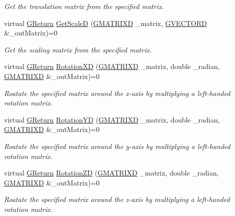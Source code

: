 \begin{DoxyCompactItemize}
\begin{DoxyCompactList}\small\item\em Get the translation matrix from the specified matrix. \end{DoxyCompactList}\item 
virtual \hyperlink{namespaceGW_a67a839e3df7ea8a5c5686613a7a3de21}{G\+Return} \hyperlink{classGW_1_1MATH_1_1GMatrix_a1d8d370c39617b8ad0fcfb42459fcb09}{Get\+ScaleD} (\hyperlink{structGW_1_1MATH_1_1GMATRIXD}{G\+M\+A\+T\+R\+I\+XD} \+\_\+matrix, \hyperlink{structGW_1_1MATH_1_1GVECTORD}{G\+V\+E\+C\+T\+O\+RD} \&\+\_\+out\+Matrix)=0
\begin{DoxyCompactList}\small\item\em Get the scaling matrix from the specified matrix. \end{DoxyCompactList}\item 
virtual \hyperlink{namespaceGW_a67a839e3df7ea8a5c5686613a7a3de21}{G\+Return} \hyperlink{classGW_1_1MATH_1_1GMatrix_abb2cbb56bb2f3963807e20ba0fe591b3}{Rotation\+XD} (\hyperlink{structGW_1_1MATH_1_1GMATRIXD}{G\+M\+A\+T\+R\+I\+XD} \+\_\+matrix, double \+\_\+radian, \hyperlink{structGW_1_1MATH_1_1GMATRIXD}{G\+M\+A\+T\+R\+I\+XD} \&\+\_\+out\+Matrix)=0
\begin{DoxyCompactList}\small\item\em Roatate the specified matrix around the x-\/axis by multiplying a left-\/handed rotation matrix. \end{DoxyCompactList}\item 
virtual \hyperlink{namespaceGW_a67a839e3df7ea8a5c5686613a7a3de21}{G\+Return} \hyperlink{classGW_1_1MATH_1_1GMatrix_a1f836790e81a0da00ad7e9e5b06969d4}{Rotation\+YD} (\hyperlink{structGW_1_1MATH_1_1GMATRIXD}{G\+M\+A\+T\+R\+I\+XD} \+\_\+matrix, double \+\_\+radian, \hyperlink{structGW_1_1MATH_1_1GMATRIXD}{G\+M\+A\+T\+R\+I\+XD} \&\+\_\+out\+Matrix)=0
\begin{DoxyCompactList}\small\item\em Roatate the specified matrix around the y-\/axis by multiplying a left-\/handed rotation matrix. \end{DoxyCompactList}\item 
virtual \hyperlink{namespaceGW_a67a839e3df7ea8a5c5686613a7a3de21}{G\+Return} \hyperlink{classGW_1_1MATH_1_1GMatrix_ae219f6b6aeddcd2969e5812c8e0a481c}{Rotation\+ZD} (\hyperlink{structGW_1_1MATH_1_1GMATRIXD}{G\+M\+A\+T\+R\+I\+XD} \+\_\+matrix, double \+\_\+radian, \hyperlink{structGW_1_1MATH_1_1GMATRIXD}{G\+M\+A\+T\+R\+I\+XD} \&\+\_\+out\+Matrix)=0
\begin{DoxyCompactList}\small\item\em Roatate the specified matrix around the z-\/axis by multiplying a left-\/handed rotation matrix. \end{DoxyCompactList}\item 

\end{DoxyCompactItemize}
